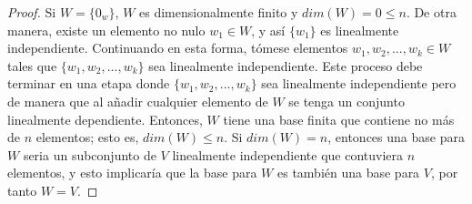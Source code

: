 \documentclass{book}
\begin{document}
\begin{proof}
Si $W=\{0_w\}$, $W$ es dimensionalmente finito y $dim(W)=0\leq n$. De otra manera, existe un elemento no nulo $w_1\in W$, y así $\{w_1\}$ es linealmente independiente. Continuando en esta forma, tómese elementos $w_1,w_2,...,w_k\in W$ tales que $\{w_1,w_2,...,w_k \}$ sea linealmente independiente. Este proceso debe terminar en una etapa donde $\{w_1,w_2,...,w_k \}$ sea linealmente independiente pero de manera que al añadir cualquier elemento de $W$ se tenga un conjunto linealmente dependiente. Entonces, $W$ tiene una base finita que contiene no más de $n$ elementos; esto es, $dim(W)\leq n$. Si $dim(W)=n$, entonces una base para $W$ seria un subconjunto de $V$ linealmente independiente que contuviera $n$ elementos, y esto implicaría que la base para $W$ es también una base para $V$, por tanto $W=V$.
\end{proof}
\end{document}
